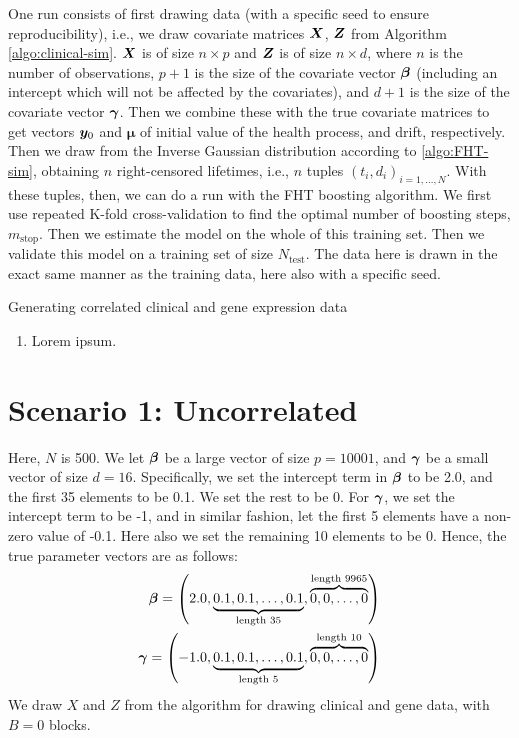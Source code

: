 One run consists of first drawing data (with a specific seed to ensure reproducibility), i.e., we draw covariate matrices $\bm{X}$, $\bm{Z}$ from Algorithm \ref{algo:clinical-sim}.
$\bm{X}$ is of size $n\times p$ and $\bm{Z}$ is of size $n\times d$, where $n$ is the number of observations, $p+1$ is the size of the covariate vector $\boldsymbol{\beta}$ (including an intercept which will not be affected by the covariates), and $d+1$ is the size of the covariate vector $\boldsymbol{\gamma}$.
Then we combine these with the true covariate matrices to get vectors $\bm{y}_0$ and $\mathbf{\mu}$ of initial value of the health process, and drift, respectively.
Then we draw from the Inverse Gaussian distribution according to \ref{algo:FHT-sim}, obtaining $n$ right-censored lifetimes, i.e., $n$ tuples $(t_i,d_i)_{i=1,\ldots,N}$.
With these tuples, then, we can do a run with the FHT boosting algorithm. We first use repeated K-fold cross-validation to find the optimal number of boosting steps, $m_{\text{stop}}$.
Then we estimate the model on the whole of this training set.
Then we validate this model on a training set of size $N_{\text{test}}$.
The data here is drawn in the exact same manner as the training data, here also with a specific seed.

\begin{algorithm}
\caption{Generating correlated clinical and gene expression data}
\label{algo:clinical-sim}
\begin{enumerate}
    \item Lorem ipsum.
\end{enumerate}
\end{algorithm}

\section{Scenario 1: Uncorrelated}

Here, $N$ is 500. We let $\boldsymbol{\beta}$ be a large vector of size $p=10001$, and $\boldsymbol{\gamma}$ be a small vector of size $d=16$. Specifically, we set the intercept term in $\boldsymbol{\beta}$ to be 2.0, and the first 35 elements to be 0.1. We set the rest to be 0. For $\boldsymbol{\gamma}$, we set the intercept term to be -1, and in similar fashion, let the first 5 elements have a non-zero value of -0.1. Here also we set the remaining 10 elements to be 0.
Hence, the true parameter vectors are as follows:
\begin{align*}
    \boldsymbol{\beta}=\left(2.0, \underbrace{0.1, 0.1, \ldots, 0.1}_{\text{length 35}}, \overbrace{0, 0, \ldots, 0}^{\text{length 9965}}\right) \\
    \boldsymbol{\gamma}=\left(-1.0, \underbrace{0.1, 0.1, \ldots, 0.1}_{\text{length 5}}, \overbrace{0, 0, \ldots, 0}^{\text{length 10}}\right)
\end{align*}
We draw $X$ and $Z$ from the algorithm for drawing clinical and gene data, with $B=0$ blocks.

